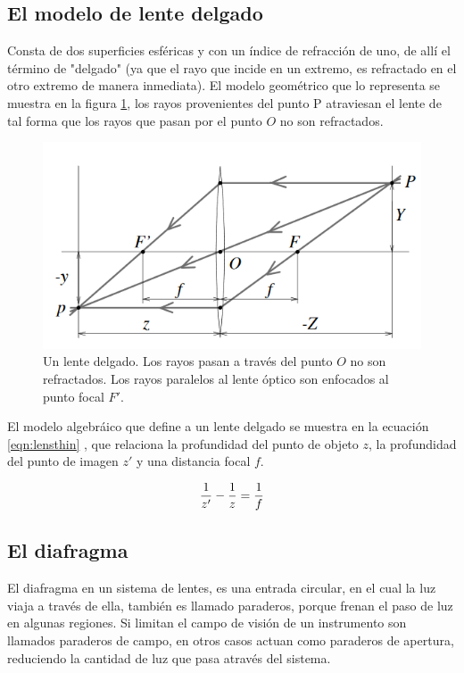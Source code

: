 \subsection{El modelo de lente delgado}
Consta de dos superficies esféricas y con un índice de refracción de uno, de allí el término de "delgado" (ya que el rayo que incide en un extremo, es refractado en el otro extremo de manera inmediata).
El modelo geométrico que lo representa se muestra en la figura \ref{lenteDelgado}, los rayos provenientes del punto P atraviesan el lente de tal forma que los rayos que pasan por el punto $O$ no son refractados. \citet{Forsyth2003}

    \begin{figure}[ht]
        \centering
        \includegraphics[scale=.75]{GraficosEdArt/ModeloLenteDelgado.PNG} 
        \caption{Un lente delgado. Los rayos pasan a través del punto $O$ no son refractados. Los rayos paralelos al lente óptico son enfocados al punto focal $F'$. \citet{Forsyth2003}}
        \label{lenteDelgado}
    \end{figure}
El modelo algebráico que define a un lente delgado se muestra en la ecuación \ref{eqn:lensthin} , que relaciona la profundidad del punto de objeto $z$, la profundidad del punto de imagen $z'$ y una distancia focal $f$.

\begin{equation} \label{eqn:lensthin}
\large  \frac{1}{z'} - \frac{1}{z} = \frac{1}{f}
\end{equation}


\subsection{El diafragma}
    El diafragma en un sistema de lentes, es una entrada circular, en el cual la luz viaja a través de ella, también es llamado paraderos, porque frenan el paso de luz en algunas regiones. Si limitan el campo de visión de un instrumento son llamados paraderos de campo, en otros casos actuan como paraderos de apertura, reduciendo la cantidad de luz que pasa através del sistema. \citet{paschotta_2020}
